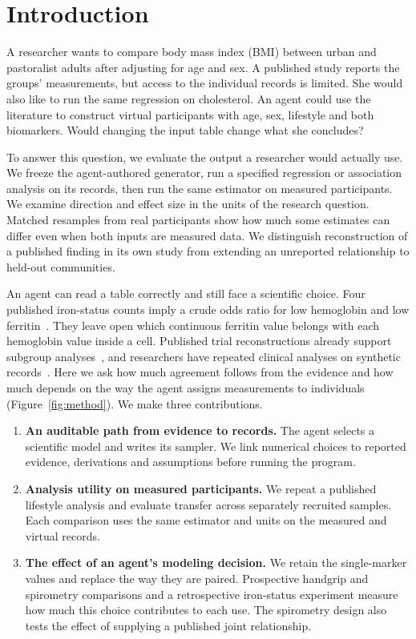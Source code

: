 \documentclass[sigconf,anonymous,review]{acmart}
\begin{document}
\section{Introduction}
A researcher wants to compare body mass index (BMI) between urban and pastoralist adults after adjusting for age and sex. A published study reports the groups' measurements, but access to the individual records is limited. She would also like to run the same regression on cholesterol. An agent could use the literature to construct virtual participants with age, sex, lifestyle and both biomarkers. Would changing the input table change what she concludes?

To answer this question, we evaluate the output a researcher would actually use. We freeze the agent-authored generator, run a specified regression or association analysis on its records, then run the same estimator on measured participants. We examine direction and effect size in the units of the research question. Matched resamples from real participants show how much some estimates can differ even when both inputs are measured data. We distinguish reconstruction of a published finding in its own study from extending an unreported relationship to held-out communities.

An agent can read a table correctly and still face a scientific choice. Four published iron-status counts imply a crude odds ratio for low hemoglobin and low ferritin~\cite{zhu}. They leave open which continuous ferritin value belongs with each hemoglobin value inside a cell. Published trial reconstructions already support subgroup analyses~\cite{synthipd}, and researchers have repeated clinical analyses on synthetic records~\cite{azizi}. Here we ask how much agreement follows from the evidence and how much depends on the way the agent assigns measurements to individuals (Figure~\ref{fig:method}). We make three contributions.
\begin{enumerate}
\item \textbf{An auditable path from evidence to records.} The agent selects a scientific model and writes its sampler. We link numerical choices to reported evidence, derivations and assumptions before running the program.
\item \textbf{Analysis utility on measured participants.} We repeat a published lifestyle analysis and evaluate transfer across separately recruited samples. Each comparison uses the same estimator and units on the measured and virtual records.
\item \textbf{The effect of an agent's modeling decision.} We retain the single-marker values and replace the way they are paired. Prospective handgrip and spirometry comparisons and a retrospective iron-status experiment measure how much this choice contributes to each use. The spirometry design also tests the effect of supplying a published joint relationship.
\end{enumerate}
\end{document}
